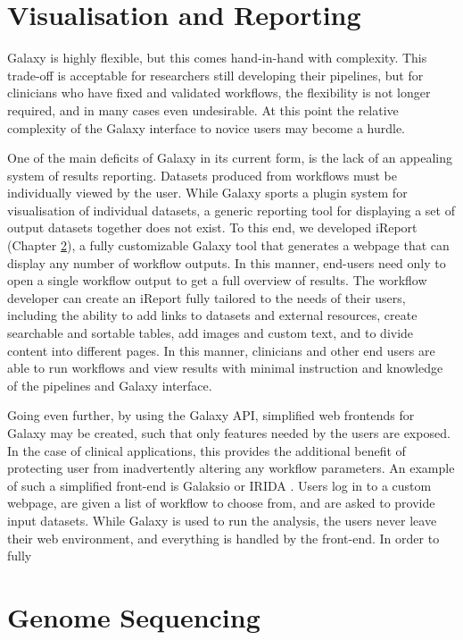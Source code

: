 \section{Visualisation and Reporting}

Galaxy is highly flexible, but this comes hand-in-hand with complexity. This trade-off is acceptable for researchers still developing their pipelines, but for clinicians who have fixed and validated workflows, the flexibility is not longer required, and in many cases even undesirable. At this point the relative complexity of the Galaxy interface to novice users may become a hurdle.

One of the main deficits of Galaxy in its current form, is the lack of an appealing system of results reporting. Datasets produced from workflows must be individually viewed by the user. While Galaxy sports a plugin system for visualisation of individual datasets, a generic reporting tool for displaying a set of output datasets together does not exist. To this end, we developed iReport (Chapter \ref{}), a fully customizable Galaxy tool that generates a webpage that can display any number of workflow outputs. In this manner, end-users need only to open a single workflow output to get a full overview of results. The workflow developer can create an iReport fully tailored to the needs of their users, including the ability to add links to datasets and external resources, create searchable and sortable tables, add images and custom text, and to divide content into different pages. In this manner, clinicians and other end users are able to run workflows and view results with minimal instruction and knowledge of the pipelines and Galaxy interface.

Going even further, by using the Galaxy API, simplified web frontends for Galaxy may be created, such that only features needed by the users are exposed. In the case of clinical applications, this provides the additional benefit of protecting user from inadvertently altering any workflow parameters. An example of such a simplified front-end is Galaksio \cite{galaksio} or IRIDA \cite{}. Users log in to a custom webpage, are given a list of workflow to choose from, and are asked to provide input datasets. While Galaxy is used to run the analysis, the users never leave their web environment, and everything is handled by the front-end. In order to fully


\section{Genome Sequencing}

